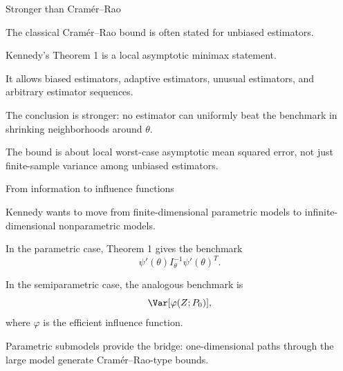 \documentclass[xcolor={table}, handout]{beamer}
\begin{document}
\note{
\scriptsize \singlespacing

}
\begin{frame}{Stronger than Cram\'er--Rao}

\begin{wideitemize}
\item The classical Cram\'er--Rao bound is often stated for unbiased estimators.\pause
\item Kennedy's Theorem 1 is a local asymptotic minimax statement.\pause
\item It allows biased estimators, adaptive estimators, unusual estimators, and arbitrary estimator sequences.\pause
\item The conclusion is stronger:
no estimator can uniformly beat the benchmark in shrinking neighborhoods around $\theta$.\pause
\item The bound is about local worst-case asymptotic mean squared error, not just finite-sample variance among unbiased estimators.
\end{wideitemize}

\end{frame}

\note{
\scriptsize \singlespacing

}
\begin{frame}{From information to influence functions}

\begin{wideitemize}
\item Kennedy wants to move from finite-dimensional parametric models to infinite-dimensional nonparametric models.\pause
\item In the parametric case, Theorem 1 gives the benchmark
\[
\psi'(\theta) I_\theta^{-1} \psi'(\theta)^T.
\]\pause
\item In the semiparametric case, the analogous benchmark is
\[
\Var[\varphi(Z;P_0)],
\]
where $\varphi$ is the efficient influence function.\pause
\item Parametric submodels provide the bridge: one-dimensional paths through the large model generate Cram\'er--Rao-type bounds.
\end{wideitemize}

\end{frame}
\end{document}
